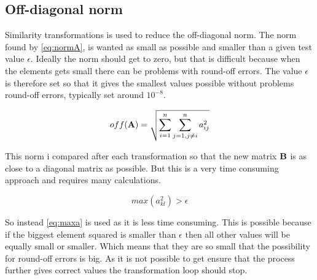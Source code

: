 

\subsection*{Off-diagonal norm}

Similarity transformations is used to reduce the off-diagonal norm. The norm found by \eqref{eq:normA}, is wanted as small as possible and smaller than a given test value $\epsilon $. Ideally the norm should get to zero, but that is difficult because when the elements gets small there can be problems with round-off errors. The value $\epsilon $ is therefore set so that it gives the smallest values possible without problems round-off errors, typically set around $10^{-8}$.  

\begin{equation}
	off(\mbox{\textbf{A}}) = \sqrt{\sum_{i=1}^n\sum_{j=1,j \ne i}^n a_{ij}^2}
	\label{eq:normA}
\end{equation} 


This norm i compared after each transformation so that the new matrix $\mbox{\textbf{B}}$ is as close to a diagonal matrix as possible. But this is a very time consuming approach and requires many calculations. 

\begin{equation*}
	max(a_{kl}^2) > \epsilon
	\label{eq:maxa}
\end{equation*}

So instead \eqref{eq:maxa} is used as it is less time consuming. This is possible because if the biggest element squared is smaller than $\epsilon$ then all other values will be equally small or smaller. Which means that they are so small that the possibility for round-off errors is big. As it is not possible to get ensure that the process further gives correct values the transformation loop should stop. 







